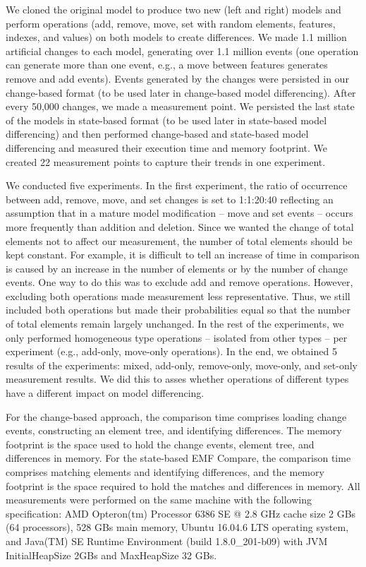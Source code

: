 We cloned the original model to produce two new (left and right) models and perform operations (\textsf{add}, \textsf{remove}, \textsf{move}, \textsf{set} with random elements, features, indexes, and values) on both models to create differences. We made 1.1 million artificial changes to each model, generating over 1.1 million events (one operation can generate more than one event, e.g., a \textsf{move} between features generates \textsf{remove} and \textsf{add} events). Events generated by the changes were persisted in our change-based format (to be used later in change-based model differencing). After every 50,000 changes, we made a measurement point. We persisted the last state of the models in state-based format (to be used later in state-based model differencing) and then performed change-based and state-based model differencing and measured their execution time and memory footprint. We created 22 measurement points to capture their trends in one experiment. 

We conducted five experiments. In the first experiment, the ratio of occurrence between \textsf{add}, \textsf{remove}, \textsf{move}, and \textsf{set} changes is set to 1:1:20:40 reflecting an assumption that in a mature model modification -- \textsf{move} and \textsf{set} events -- occurs more frequently than addition and deletion. Since we wanted the change of total elements not to affect our measurement, the number of total elements should be kept constant. For example, it is difficult to tell an increase of time in comparison is caused by an increase in the number of elements or by the number of change events. One way to do this was to exclude \textsf{add} and \textsf{remove} operations. However, excluding both operations made measurement less representative. Thus, we still included both operations but made their probabilities equal so that the number of total elements remain largely unchanged. In the rest of the experiments,
we only performed homogeneous type operations -- isolated from other types -- per experiment (e.g., add-only, move-only operations). In the end, we obtained 5 results of the experiments: mixed, add-only, remove-only, move-only, and set-only measurement results. We did this to asses whether operations of different types have a different impact on model differencing.

For the change-based approach, the comparison time comprises loading change events, constructing an element tree, and identifying differences. The memory footprint is the space used to hold the change events, element tree, and differences in memory. For the state-based EMF Compare, the comparison time comprises matching elements and identifying differences, and the memory footprint is the space required to hold the matches and differences in memory. All measurements were performed on the same machine with the following specification: AMD Opteron(tm) Processor 6386 SE @ 2.8 GHz cache size 2 GBs (64 processors), 528 GBs main memory, Ubuntu 16.04.6 LTS operating system, and Java(TM) SE Runtime Environment (build 1.8.0\_201-b09) with JVM \textsf{InitialHeapSize} 2GBs and \textsf{MaxHeapSize} 32 GBs.

